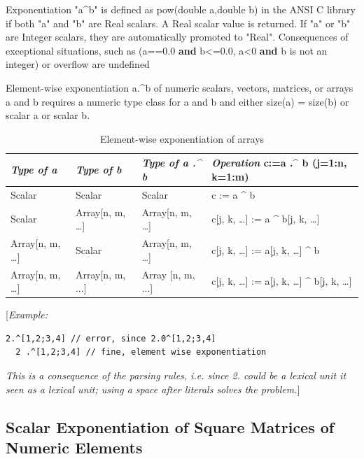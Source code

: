 \documentclass[10pt,a4paper]{report}
\def\doublelabel#1{\label{#1}}
\begin{document}
Exponentiation "a\^{}b" is defined as pow(double a,double b) in the ANSI
C library if both "a" and "b" are Real scalars. A Real scalar value is
returned. If "a" or "b" are Integer scalars, they are automatically
promoted to "Real". Consequences of exceptional situations, such as
(a==0.0 \textbf{and} b\textless{}=0.0, a\textless{}0 \textbf{and} b is
not an integer) or overflow are undefined

Element-wise exponentiation a.\^{}b of numeric scalars, vectors,
matrices, or arrays a and b requires a numeric type class for a and b
and either size(a) = size(b) or scalar a or scalar b.

\begin{longtable}[]{|l|l|l|l|}
\caption{Element-wise exponentiation of arrays}\\
\hline
\emph{Type of a} & \emph{Type of b} & \emph{Type of a .\^{} b} &
\emph{Operation} c:=a .\^{} b (j=1:n, k=1:m)\\ \hline
\endhead
Scalar & Scalar & Scalar & c := a \^{} b\\ \hline
Scalar & Array{[}n, m, \ldots{}{]} & Array{[}n, m, \ldots{}{]} & c{[}j,
k, \ldots{}{]} := a \^{} b{[}j, k, \ldots{}{]}\\ \hline
Array{[}n, m, \ldots{}{]} & Scalar & Array{[}n, m, \ldots{}{]} & c{[}j,
k, \ldots{}{]} := a{[}j, k, \ldots{}{]} \^{} b\\ \hline
Array{[}n, m, \ldots{}{]} & Array{[}n, m, ...{]} & Array {[}n, m, ...{]}
& c{[}j, k, \ldots{}{]} := a{[}j, k, \ldots{}{]} \^{} b{[}j, k,
\ldots{}{]}\\ \hline

\end{longtable}

{[}\emph{Example:}

\begin{lstlisting}[language=modelica]
  2.^[1,2;3,4] // error, since 2.0^[1,2;3,4]
  2 .^[1,2;3,4] // fine, element wise exponentiation
\end{lstlisting}
\emph{This is a consequence of the parsing rules, i.e. since 2. could be
a lexical unit it seen as a lexical unit; using a space after literals
solves the problem.}{]}

\subsection{Scalar Exponentiation of Square Matrices of Numeric Elements}\doublelabel{scalar-exponentiation-of-square-matrices-of-numeric-elements}
\end{document}
